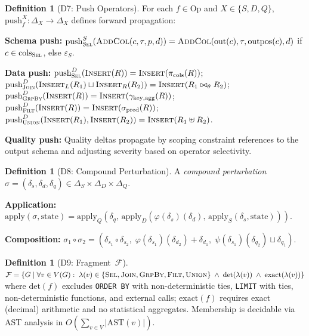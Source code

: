 \documentclass[11pt,a4paper]{article}
\theoremstyle{definition}
\newtheorem{definition}[theorem]{Definition}
\newcommand{\DeltaS}{\Delta_{\!S}}
\newcommand{\DeltaD}{\Delta_{\!D}}
\newcommand{\DeltaQ}{\Delta_{\!Q}}
\newcommand{\epsS}{\varepsilon_S}
\newcommand{\push}{\mathrm{push}}
\newcommand{\Op}{\mathrm{Op}}
\newcommand{\FragF}{\mathcal{F}}
\begin{document}
\begin{definition}[D7: Push Operators]\label{def:push}
For each $f \in \Op$ and $X \in \{S, D, Q\}$,
$\push_f^X\colon \Delta_X \to \Delta_X$ defines forward propagation:

\textbf{Schema push:}
$\push_{\textsc{Sel}}^S(\textsc{AddCol}(c,\tau,p,d)) =
\textsc{AddCol}(\mathrm{out}(c), \tau, \mathrm{outpos}(c), d)$ if
$c \in \mathrm{cols}_{\textsc{Sel}}$, else $\epsS$.

\textbf{Data push:}
$\push_{\textsc{Sel}}^D(\textsc{Insert}(R)) = \textsc{Insert}(\pi_{\mathrm{cols}}(R))$;
$\push_{\textsc{Join}}^D(\textsc{Insert}_L(R_1) \sqcup \textsc{Insert}_R(R_2))
= \textsc{Insert}(R_1 \bowtie_\theta R_2)$;
$\push_{\textsc{GrpBy}}^D(\textsc{Insert}(R)) = \textsc{Insert}(\gamma_{\mathrm{key,agg}}(R))$;
$\push_{\textsc{Filt}}^D(\textsc{Insert}(R)) = \textsc{Insert}(\sigma_{\mathrm{pred}}(R))$;
$\push_{\textsc{Union}}^D(\textsc{Insert}(R_1), \textsc{Insert}(R_2))
= \textsc{Insert}(R_1 \uplus R_2)$.

\textbf{Quality push:}
Quality deltas propagate by scoping constraint references to the output schema
and adjusting severity based on operator selectivity.
\end{definition}

\begin{definition}[D8: Compound Perturbation]\label{def:compound}
A \emph{compound perturbation}
$\sigma = (\delta_s, \delta_d, \delta_q) \in \DeltaS \times \DeltaD \times \DeltaQ$.

\textbf{Application:}
$\mathrm{apply}(\sigma, \mathrm{state}) =
  \mathrm{apply}_Q(\delta_q,\,
    \mathrm{apply}_D(\varphi(\delta_s)(\delta_d),\,
      \mathrm{apply}_S(\delta_s, \mathrm{state})))$.

\textbf{Composition:}
$\sigma_1 \circ \sigma_2 = (\delta_{s_1} \circ \delta_{s_2},\;
  \varphi(\delta_{s_1})(\delta_{d_2}) + \delta_{d_1},\;
  \psi(\delta_{s_1})(\delta_{q_2}) \sqcup \delta_{q_1})$.
\end{definition}

\begin{definition}[D9: Fragment~$\FragF$]\label{def:fragment-f}
$\FragF = \{G \mid \forall v \in V(G):\;
  \lambda(v) \in \{\textsc{Sel}, \textsc{Join}, \textsc{GrpBy}, \textsc{Filt}, \textsc{Union}\}
  \;\wedge\; \mathrm{det}(\lambda(v)) \;\wedge\; \mathrm{exact}(\lambda(v))\}$
where $\mathrm{det}(f)$ excludes \texttt{ORDER BY} with non-deterministic ties,
\texttt{LIMIT} with ties, non-deterministic functions, and external calls;
$\mathrm{exact}(f)$ requires exact (decimal) arithmetic and no statistical
aggregates.  Membership is decidable via AST analysis in
$O(\sum_{v \in V} |\mathrm{AST}(v)|)$.
\end{definition}
\end{document}
